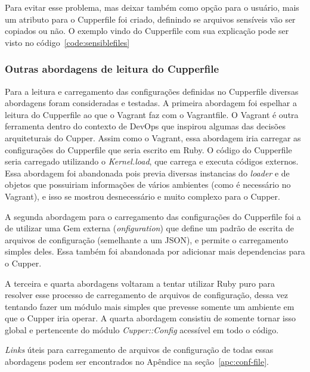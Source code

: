 Para evitar esse problema, mas deixar também como opção para o usuário, mais um
atributo para o Cupperfile foi criado, definindo se arquivos sensíveis vão ser
copiados ou não. O exemplo vindo do Cupperfile com sua explicação pode ser visto no
código~\ref{code:sensiblefiles}

\noindent\begin{minipage}{0.7\textwidth}
  \lstset{style=shell}
  
\end{minipage}\hfill

\subsubsection{Outras abordagens de leitura do Cupperfile}
Para a leitura e carregamento das configurações definidas no Cupperfile diversas
abordagens foram consideradas e testadas. A primeira abordagem foi espelhar a
leitura do Cupperfile ao que o Vagrant faz com o Vagrantfile. O Vagrant é outra
ferramenta dentro do contexto de DevOps que inspirou algumas das decisões arquiteturais
do Cupper. Assim como o Vagrant, essa abordagem iria carregar as configurações
do Cupperfile que seria escrito em Ruby. O código do Cupperfile seria carregado
utilizando o \textit{Kernel.load}, que carrega e executa códigos externos.
Essa abordagem foi abandonada pois previa diversas instancias do \textit{loader}
e de objetos que possuiriam informações de vários ambientes (como é necessário
no Vagrant), e isso se mostrou desnecessário e muito complexo para o Cupper.

A segunda abordagem para o carregamento das configurações do Cupperfile foi a de
utilizar uma Gem externa (\textit{onfiguration}) que define um padrão de escrita de 
arquivos de configuração (semelhante a um JSON), e permite o carregamento 
simples deles. Essa também foi abandonada por adicionar mais dependencias para o Cupper.

A terceira e quarta abordagens voltaram a tentar utilizar Ruby puro para resolver
esse processo de carregamento de arquivos de configuração, dessa vez tentando 
fazer um módulo mais simples que prevesse somente um ambiente em que o Cupper
iria operar. A quarta abordagem consistiu de somente tornar isso global e
pertencente do módulo \textit{Cupper::Config} acessível em todo o código.

\textit{Links} úteis para carregamento de arquivos de configuração de todas essas
abordagens podem ser encontrados no Apêndice na seção~\ref{apc:conf-file}.

